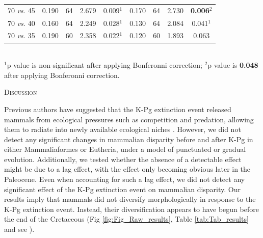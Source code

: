 \documentclass[12pt,letterpaper]{article}
\renewcommand{\section}[1]{%
\bigskip
\begin{center}
\begin{Large}
\normalfont\scshape #1
\medskip
\end{Large}
\end{center}}
\begin{document}
\begin{table}[ht]
\begin{tabular}{c|cccc|cccc}
  70 \textit{vs.} 45 & 0.190 & 64 & 2.679 & 0.009$^1$ & 0.170 & 64 & 2.730 & \textbf{0.006}$^2$ \\ 
  70 \textit{vs.} 40 & 0.160 & 64 & 2.249 & 0.028$^1$ & 0.130 & 64 & 2.084 & 0.041$^1$ \\ 
  70 \textit{vs.} 35 & 0.190 & 60 & 2.358 & 0.022$^1$ & 0.120 & 60 & 1.893 & 0.063 \\ 
   \hline
\end{tabular} \\
   \small{$^1$p value is non-significant after applying Bonferonni correction;
   $^2$p value is \textbf{0.048} after applying Bonferonni correction.}
\end{table}



%
%

\section{Discussion}
Previous authors have suggested that the K-Pg extinction event released mammals from ecological pressures such as competition and predation, allowing them to radiate into newly available ecological niches \cite{archibald2011extinction,OLeary08022013,Lovergrove,Slater2012MEE}.
However, we did not detect any significant changes in mammalian disparity before and after K-Pg in either Mammaliaformes or Eutheria, under a model of punctuated or gradual evolution.
Additionally, we tested whether the absence of a detectable effect might be due to a lag effect, with the effect only becoming obvious later in the Paleocene.
Even when accounting for such a lag effect, we did not detect any significant effect of the K-Pg extinction event on mammalian disparity.
Our results imply that mammals did not diversify morphologically in response to the K-Pg extinction event.
Instead, their diversification appears to have begun before the end of the Cretaceous (Fig \ref{fig:Fig_Raw_results}, Table \ref{tab:Tab_results} and see \cite{meredithimpacts2011,dosReis2014,Close2015,Lee2015R759}).
\end{document}
